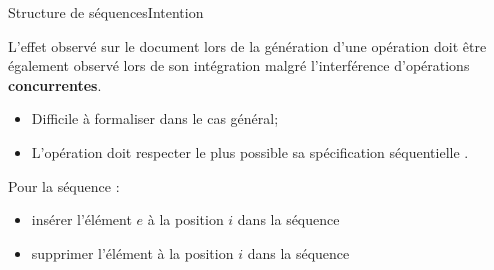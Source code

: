 \begin{frame}{Structure de séquences}{Intention}
  
  L'effet observé sur le document lors de la génération d'une opération doit
  être également observé lors de son intégration malgré l'interférence
  d'opérations \textbf{concurrentes}.

  \vspace{0.5cm}

  \begin{itemize}
  \item Difficile à formaliser dans le cas général;
  \item L'opération doit respecter le plus possible sa spécification
    séquentielle .
  \end{itemize}

  \vspace{0.5cm}
  
  Pour la séquence :
  \begin{itemize}
  \item \og insérer l'élément $e$ à la position $i$ dans la séquence \fg
  \item \og supprimer l'élément à la position $i$ dans la séquence \fg
  \end{itemize}

  \vspace{0.5cm}

  \begin{itemize}
  \end{itemize}

  \vspace{0.2cm}
  
\end{frame}

